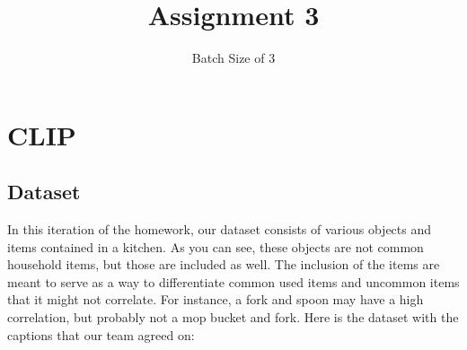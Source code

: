 \documentclass[]{article}
\title{Assignment 3}
\author{Batch Size of 3}
\begin{document}
\maketitle

\clearpage
\section{CLIP}

\subsection{Dataset}

In this iteration of the homework, our dataset consists of various objects and items contained in a kitchen. As you can see, these objects are not common household items, but those are included as well. The inclusion of the items are meant to serve as a way to differentiate common used items and uncommon items that it might not correlate. For instance, a fork and spoon may have a high correlation, but probably not a mop bucket and fork. Here is the dataset with the captions that our team agreed on:
\end{document}
